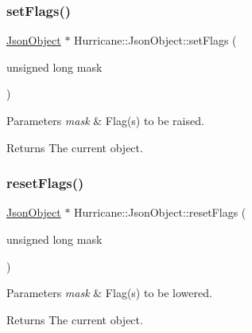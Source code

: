 \mbox{\label{classHurricane_1_1JsonObject_a5216e5f5d74f8dbf8665eef8a78b2fe1}} 
\subsubsection{\texorpdfstring{set\+Flags()}{setFlags()}}
{\footnotesize\ttfamily \mbox{\hyperlink{classHurricane_1_1JsonObject}{Json\+Object}} $\ast$ Hurricane\+::\+Json\+Object\+::set\+Flags (\begin{DoxyParamCaption}\item[{unsigned long}]{mask }\end{DoxyParamCaption})\hspace{0.3cm}{\ttfamily [inline]}}


\begin{DoxyParams}{Parameters}
{\em mask} & Flag(s) to be raised. \\
\hline
\end{DoxyParams}
\begin{DoxyReturn}{Returns}
The current object. 
\end{DoxyReturn}
\mbox{\label{classHurricane_1_1JsonObject_a8346b1c958574275fe17f9c4cb40ee8b}} 
\subsubsection{\texorpdfstring{reset\+Flags()}{resetFlags()}}
{\footnotesize\ttfamily \mbox{\hyperlink{classHurricane_1_1JsonObject}{Json\+Object}} $\ast$ Hurricane\+::\+Json\+Object\+::reset\+Flags (\begin{DoxyParamCaption}\item[{unsigned long}]{mask }\end{DoxyParamCaption})\hspace{0.3cm}{\ttfamily [inline]}}


\begin{DoxyParams}{Parameters}
{\em mask} & Flag(s) to be lowered. \\
\hline
\end{DoxyParams}
\begin{DoxyReturn}{Returns}
The current object. 
\end{DoxyReturn}
\mbox{\label{classHurricane_1_1JsonObject_a267c55a1989a9907e25632d820681779}} 
